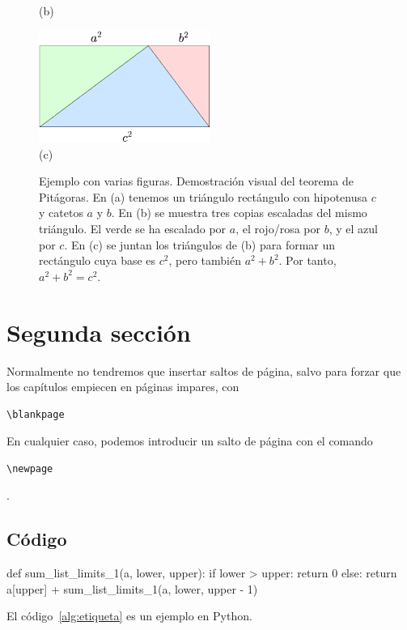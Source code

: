 \begin{figure}
\begin{minipage}{0.45\textwidth}
   \footnotesize (b)
  \end{minipage}

    \bigskip

    \includegraphics[clip=true,width=0.5\textwidth]{triangulos_unidos_bb.pdf}\\
    \footnotesize (c)

  \caption{Ejemplo con varias figuras. Demostración visual del teorema de Pitágoras. En (a) tenemos un triángulo rectángulo con hipotenusa $c$ y catetos $a$ y $b$. En (b) se muestra tres copias escaladas del mismo triángulo. El verde se ha escalado por $a$, el rojo/rosa por $b$, y el azul por $c$. En (c) se juntan los triángulos de (b) para formar un rectángulo cuya base es $c^{2}$, pero también $a^{2} + b^{2}$. Por tanto, $a^{2} + b^{2} = c^{2}$.}\label{fig:teoremapitagoras}
\end{figure}





\section{Segunda sección}

Normalmente no tendremos que insertar saltos de página, salvo para forzar que los capítulos empiecen en páginas impares, con \begin{verbatim}\blankpage\end{verbatim} En cualquier caso, podemos introducir un salto de página con el comando \begin{verbatim}\newpage\end{verbatim}.

\newpage



\subsection{Código}


\begin{mypython}[float={!t},caption={Titulo del algoritmo/código.},label={alg:etiqueta}]
def sum_list_limits_1(a, lower, upper):
    if lower > upper:
        return 0
    else:
        return a[upper] + sum_list_limits_1(a, lower, upper - 1)
\end{mypython}
El código~\ref{alg:etiqueta} es un ejemplo en Python.



